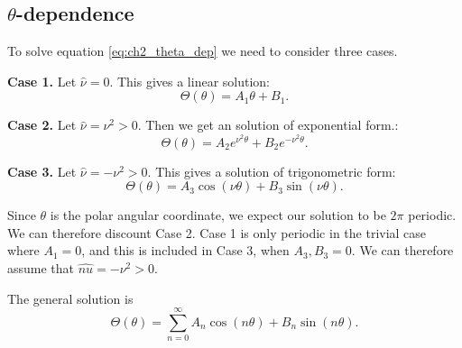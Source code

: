 \subsection{\texorpdfstring{$\theta$}{theta}-dependence}
To solve equation \eqref{eq:ch2_theta_dep} we need to consider three cases. \par
%
\textbf{Case 1.} Let $\hat{\nu} = 0$. This gives a linear solution:
    \begin{equation}
        \Theta(\theta) = A_1 \theta + B_1.
    \end{equation}\par
%
\textbf{Case 2.} Let $\hat{\nu} = \nu^2 > 0.$ Then we get an solution of exponential form.:
    \begin{equation}
        \Theta(\theta) = A_2 e^{\nu^2 \theta} + B_2 e^{- \nu^2 \theta}.
    \end{equation}\par
%
\textbf{Case 3.} Let $\hat{\nu}= - \nu^2 > 0$. This gives a solution of trigonometric form:
    \begin{equation}
        \Theta(\theta) = A_3 \cos(\nu\theta) + B_3 \sin(\nu\theta).
    \end{equation}\par
%
Since $\theta$ is the polar angular coordinate, we expect our solution to be $2\pi$ periodic. We can therefore discount Case 2. Case 1 is only periodic in the trivial case where $A_1 = 0$, and this is included in Case 3, when $A_3, B_3 = 0.$ We can therefore assume that $\hat{nu} = - \nu^2 > 0$.
%
\begin{propn} The general solution is
      \begin{equation}
          \Theta(\theta) = \sum^\infty_{n=0} A_n \cos(n \theta) + B_n \sin(n \theta).
      \end{equation}
  \end{propn}
